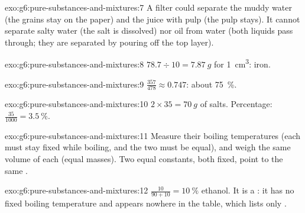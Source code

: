 \begin{solution}{exo:g6:pure-substances-and-mixtures:7}
A filter could separate the muddy water (the grains stay on the paper)
and the juice with pulp (the pulp stays). It cannot separate salty water
(the salt is dissolved) nor oil from water (both liquids pass through;
they are separated by pouring off the top layer).
\end{solution}

\begin{solution}{exo:g6:pure-substances-and-mixtures:8}
$78.7 \div 10 = \qty{7.87}{g}$ for \qty{1}{cm^3}: iron.
\end{solution}

\begin{solution}{exo:g6:pure-substances-and-mixtures:9}
$\frac{357}{478} \approx 0.747$: about \qty{75}{\percent}.
\end{solution}

\begin{solution}{exo:g6:pure-substances-and-mixtures:10}
$2 \times 35 = \qty{70}{g}$ of salts. Percentage: $\frac{35}{1000} =
\qty{3.5}{\percent}$.
\end{solution}

\begin{solution}{exo:g6:pure-substances-and-mixtures:11}
Measure their boiling temperatures (each must stay fixed while boiling,
and the two must be equal), and weigh the same volume of each (equal
masses). Two equal constants, both fixed, point to the same .
\end{solution}

\begin{solution}{exo:g6:pure-substances-and-mixtures:12}
$\frac{10}{90 + 10} = \qty{10}{\percent}$ ethanol. It is a : it
has no fixed boiling temperature and appears nowhere in the table, which
lists only .
\end{solution}

